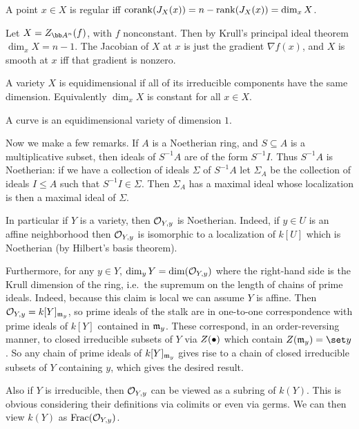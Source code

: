     A point $x\in X$ is regular iff ${\rm corank}(J_X(x))=n-{\rm rank}(J_X(x))=\dim_xX$.

\ecoro

\bcoro

    Let $X=Z_{\bA^n}(f)$, with $f$ nonconstant.
    Then by Krull's principal ideal theorem $\dim_xX=n-1$.
    The Jacobian of $X$ at $x$ is just the gradient $\nabla f(x)$, and $X$ is smooth at $x$ iff that gradient is nonzero.

\ecoro

\bdefn

    A variety $X$ is {\emphcolor equidimensional} if all of its irreducible components have the same dimension.
    Equivalently $\dim_xX$ is constant for all $x\in X$.

\edefn

\bdefn

    A {\emphcolor curve} is an equidimensional variety of dimension $1$.

\edefn

Now we make a few remarks.
If $A$ is a Noetherian ring, and $S\subseteq A$ is a multiplicative subset, then ideals of $S^{-1}A$ are of the form $S^{-1}I$.
Thus $S^{-1}A$ is Noetherian: if we have a collection of ideals $\Sigma$ of $S^{-1}A$ let $\Sigma_A$ be the collection of ideals $I\leq A$
such that $S^{-1}I\in\Sigma$.
Then $\Sigma_A$ has a maximal ideal whose localization is then a maximal ideal of $\Sigma$.

In particular if $Y$ is a variety, then ${{\cal O}}_{Y,y}$ is Noetherian.
Indeed, if $y\in U$ is an affine neighborhood then ${{\cal O}}_{Y,y}$ is isomorphic to a localization of $k[U]$ which is Noetherian (by Hilbert's basis theorem).

Furthermore, for any $y\in Y$, $\dim_yY=\dim({{\cal O}}_{Y,y})$ where the right-hand side is the Krull dimension of the ring, i.e.\ the supremum on the length of chains of prime ideals.
Indeed, because this claim is local we can assume $Y$ is affine.
Then ${{\cal O}}_{Y,y}=k[Y]_{{{\frak m}}_y}$, so prime ideals of the stalk are in one-to-one correspondence with prime ideals of $k[Y]$ contained in ${{\frak m}}_y$.
These correspond, in an order-reversing manner, to closed irreducible subsets of $Y$ via $Z(\bullet)$ which contain $Z(\m_y)=\set y$.
So any chain of prime ideals of $k[Y]_{{{\frak m}}_y}$ gives rise to a chain of closed irreducible subsets of $Y$ containing $y$, which gives the desired result.

Also if $Y$ is irreducible, then ${{\cal O}}_{Y,y}$ can be viewed as a subring of $k(Y)$.
This is obvious considering their definitions via colimits or even via germs.
We can then view $k(Y)$ as ${\rm Frac}({{\cal O}}_{Y,y})$.

